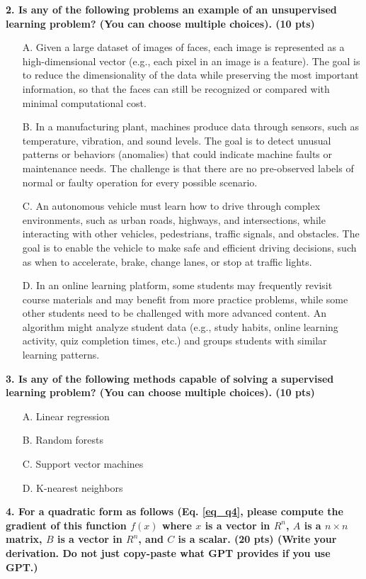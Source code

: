 \documentclass{article}
\begin{document}
\textbf{2. Is any of the following problems an example of an unsupervised learning problem? (You can choose multiple choices). (10 pts)}

\begin{itemize}
    \item[A.] Given a large dataset of images of faces, each image is represented as a high-dimensional vector (e.g., each pixel in an image is a feature). The goal is to reduce the dimensionality of the data while preserving the most important information, so that the faces can still be recognized or compared with minimal computational cost.
    \item[B.] In a manufacturing plant, machines produce data through sensors, such as temperature, vibration, and sound levels. The goal is to detect unusual patterns or behaviors (anomalies) that could indicate machine faults or maintenance needs. The challenge is that there are no pre-observed labels of normal or faulty operation for every possible scenario.
    \item[C.] An autonomous vehicle must learn how to drive through complex environments, such as urban roads, highways, and intersections, while interacting with other vehicles, pedestrians, traffic signals, and obstacles. The goal is to enable the vehicle to make safe and efficient driving decisions, such as when to accelerate, brake, change lanes, or stop at traffic lights.
    \item[D.] In an online learning platform, some students may frequently revisit course materials and may benefit from more practice problems, while some other students need to be challenged with more advanced content. An algorithm might analyze student data (e.g., study habits, online learning activity, quiz completion times, etc.) and groups students with similar learning patterns.
\end{itemize}

\textbf{3. Is any of the following methods capable of solving a supervised learning problem? (You can choose multiple choices). (10 pts)}

\begin{itemize}
    \item[A.] Linear regression
    \item[B.] Random forests
    \item[C.] Support vector machines
    \item[D.] K-nearest neighbors
\end{itemize}


\textbf{4. For a quadratic form as follows (Eq. \ref{eq_q4}, please compute the gradient of this function $f(x)$ where $x$ is a vector in $R^n$, $A$ is a $n \times n$ matrix, $B$ is a vector in $R^n$, and $C$ is a scalar. (20 pts) (Write your derivation. Do not just copy-paste what GPT provides if you use GPT.)}
\end{document}
